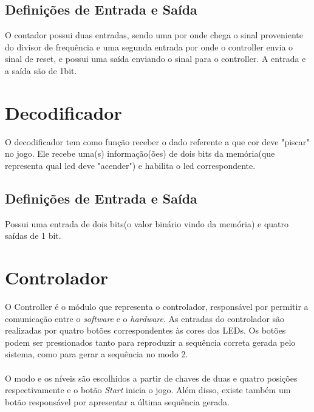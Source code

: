 \documentclass{report}
\begin{document}
    \subsection{Definições de Entrada e Saída}
    
O contador possui duas entradas, sendo uma por onde chega o sinal proveniente do divisor de frequência e uma segunda entrada por onde o controller envia o sinal de reset, e possui uma saída enviando o sinal para o controller. A entrada e a saída são de 1bit.

   
  \section{Decodificador}
  
  O decodificador tem como função receber o dado referente a que cor deve "piscar" no jogo. Ele recebe uma(s) informação(ões) de dois bits da memória(que representa qual led deve "acender") e habilita o led correspondente.
  
    \subsection{Definições de Entrada e Saída}
    Possui uma entrada de dois bits(o valor binário vindo da memória) e quatro saídas de 1 bit.
    \paragraph{}
    
    
 \section{Controlador}
 O Controller é o módulo que representa o controlador, responsável por permitir a comunicação entre o \textit{software} e o \textit{hardware}. 
 As entradas do controlador são realizadas por quatro botões correspondentes às cores dos LEDs. Os botões podem ser pressionados tanto para reproduzir a sequência correta gerada pelo sistema, como para gerar a sequência no modo 2.
 \paragraph{}
   O modo e os níveis são escolhidos a partir de chaves de duas e quatro posições respectivamente e o botão \textit{Start} inicia o jogo. Além disso, existe também um botão responsável por apresentar a última sequência gerada.
 
\end{document}
